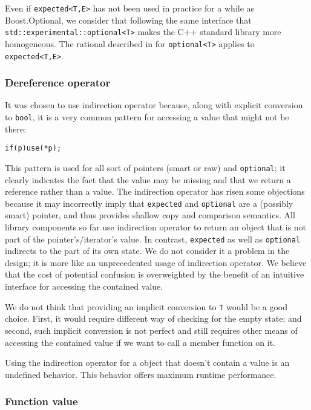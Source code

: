 \documentclass[a4paper,10pt]{article}
\newcommand{\cpp}[1]{\lstinline{#1}}
\begin{document}
Even if \cpp{expected<T,E>} has not been used in practice for a while as Boost.Optional, we consider that following the same interface that \cpp{std::experimental::optional<T>} makes the C++ standard library more homogeneous. The rational described in \cite{OptionalRev4} for \cpp{optional<T>} applies to \cpp{expected<T,E>}. 

\subsubsection{Dereference operator}

It was chosen to use indirection operator because, along with explicit conversion to \cpp{bool}, it is a very common pattern for accessing a value that might not be there:

\begin{alltt}
if (p) use(*p);
\end{alltt}

This pattern is used for all sort of pointers (smart or raw) and \cpp{optional}; it clearly indicates the fact that the value may be missing and that we return a reference rather than a value. The indirection operator has risen some objections because it may incorrectly imply that \cpp{expected} and \cpp{optional} are a (possibly smart) pointer, and thus provides shallow copy and comparison semantics. All library components so far use indirection operator to return an object that is not part of the pointer's/iterator's value. In contrast, \cpp{expected} as well as \cpp{optional} indirects to the part of its own state. We do not consider it a problem in the design; it is more like an unprecedented usage of indirection operator. We believe that the cost of potential confusion is overweighted by the benefit of an intuitive interface for accessing the contained value.

We do not think that providing an implicit conversion to \cpp{T} would be a good choice. First, it would require different way of checking for the empty state; and second, such implicit conversion is not perfect and still requires other means of accessing the contained value if we want to call a member function on it.

Using the indirection operator for a object that doesn't contain a value is an undefined behavior. This behavior offers maximum runtime performance.

\subsubsection{Function value}
\end{document}
